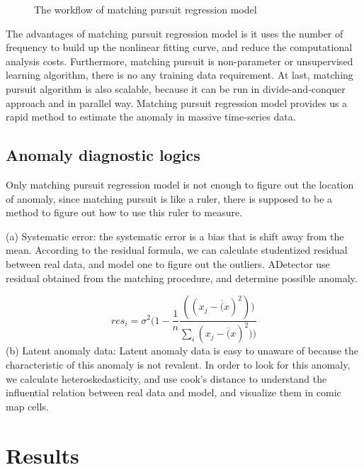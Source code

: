 \documentclass{vgtc}                          %
\begin{document}
\begin{figure}[htb]
	\caption{The workflow of matching pursuit regression model}
\end{figure}

The advantages of matching pursuit regression model is it uses the number of frequency to build up the nonlinear fitting curve, and reduce the computational analysis costs. Furthermore, matching pursuit is non-parameter or unsupervised learning algorithm, there is no any training data requirement. At last, matching pursuit algorithm is also scalable, because it can be run in divide-and-conquer approach and in parallel way. Matching pursuit regression model provides us a rapid method to estimate the anomaly in massive time-series data. 

\subsection{Anomaly diagnostic logics}
	Only matching pursuit regression model is not enough to figure out the location of anomaly, since matching pursuit is like a ruler, there is supposed to be a method to figure out how to use this ruler to measure.
	
		(a) Systematic error: the systematic error is a bias that is shift away from the mean. According to the residual formula, we can calculate studentized residual between real data, and model one to figure out the outliers. ADetector use residual obtained from the matching procedure, and determine possible anomaly.
			
	\begin{equation}
	 res_i = \sigma^2 ( 1 -\frac{1}{n} \frac{((x_j - \overline(x)^2))}{\sum_i(x_j - \overline(x)^2))}
	\end{equation}		 
		(b) Latent anomaly data: Latent anomaly data is easy to unaware of because the characteristic of this anomaly is not revalent. In order to look for this anomaly, we calculate heteroskedasticity, and use cook's distance to understand the influential relation between real data and model, and visualize them in comic map cells. 

\section{Results}
\end{document}
